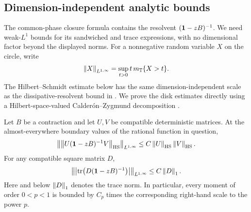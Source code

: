 \subsection{Dimension-independent analytic bounds}

The common-phase closure formula contains the resolvent
$(\mathbf 1-zB)^{-1}$. We need weak-$L^1$ bounds for its sandwiched and trace
expressions, with no dimensional factor beyond the displayed norms.
For a nonnegative random variable $X$ on the circle, write
\[
 \left\lVert X\right\rVert_{L^{1,\infty}}
    =\sup_{t>0}t\,m_\mathbb T\{X>t\}.
\]
The Hilbert--Schmidt estimate below has the same dimension-independent
scale as the dissipative-resolvent bound in
\cite[Lemma~3.1 and Appendix~C]{AizenmanElgartNabokoSchenkerStolz2006}.
We prove the disk estimates directly using a Hilbert-space-valued
Calder\'on--Zygmund decomposition
\cite[Theorem~1]{BenedekCalderonPanzone1962}.

\begin{lemma}\label{mat:weak}
Let $B$ be a contraction and let $U,V$ be compatible deterministic
matrices. At the almost-everywhere boundary values of the rational
function in question,
\begin{equation}
 \left\|\left\lVert U(\mathbf 1-zB)^{-1}V\right\rVert_{\mathrm{HS}}\right\|_{L^{1,\infty}}
       \le C\left\lVert U\right\rVert_{\mathrm{HS}}\left\lVert V\right\rVert_{\mathrm{HS}}.
 \label{mat:weak-sandwich}
\end{equation}
For any compatible square matrix $D$,
\begin{equation}
 \left\|\left\lvert\operatorname{tr}\bigl(D(\mathbf 1-zB)^{-1}\bigr)\right\rvert\right\|_{L^{1,\infty}}
       \le C\left\lVert D\right\rVert_1.
 \label{mat:weak-trace}
\end{equation}
Here and below $\left\lVert D\right\rVert_1$ denotes the trace norm. In particular, every
moment of order $0<p<1$ is bounded by $C_p$ times the corresponding
right-hand scale to the power $p$.
\end{lemma}


